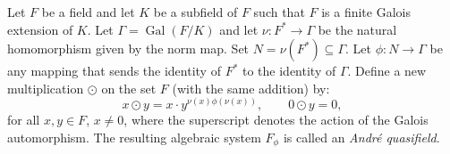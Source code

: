 Let $F$ be a field and let $K$ be a subfield of $F$ such that $F$ is a finite Galois extension of $K$. Let $\Gamma = \operatorname{Gal}(F/K)$ and let $\nu: F^* \to \Gamma$ be the natural homomorphism given by the norm map. Set $N = \nu(F^*) \subseteq \Gamma$. Let $\phi: N \to \Gamma$ be any mapping that sends the identity of $F^*$ to the identity of $\Gamma$. Define a new multiplication $\odot$ on the set $F$ (with the same addition) by:
$$
x \odot y = x \cdot y^{\nu(x)\phi(\nu(x))}, \qquad 0 \odot y = 0,
$$
for all $x, y \in F$, $x \neq 0$, where the superscript denotes the action of the Galois automorphism. The resulting algebraic system $F_\phi$ is called an \emph{André quasifield}.